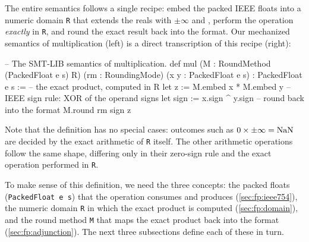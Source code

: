 The entire semantics follows a single recipe:
embed the packed IEEE floats into a numeric domain \texttt{R} that extends the reals with $\pm\infty$ and \nan{},
perform the operation \emph{exactly} in \texttt{R}, and round the exact result back into the format.
Our mechanized semantics of multiplication (left) is a direct transcription of this recipe (right):

\medskip
\noindent
\begin{minipage}[c]{0.5\linewidth}
\begin{lean4}[fontsize=\footnotesize]
-- The SMT-LIB semantics of multiplication.
def mul (M : RoundMethod (PackedFloat e s) R)
    (rm : RoundingMode)
    (x y : PackedFloat e s) : PackedFloat e s :=
  -- the exact product, computed in R
  let z    := M.embed x * M.embed y
  -- IEEE sign rule: XOR of the operand signs
  let sign := x.sign ^ y.sign
  -- round back into the format
  M.round rm sign z
\end{lean4}
\end{minipage}\hfill
\begin{minipage}[c]{0.49\linewidth}
\centering
{}
\end{minipage}
\medskip

\noindent
Note that the definition has no special cases:
outcomes such as $0 \times \pm\infty = \mathrm{NaN}$ are decided by the exact arithmetic of \texttt{R} itself.
The other arithmetic operations follow the same shape,
differing only in their zero-sign rule and the exact operation performed in \texttt{R}.

To make sense of this definition, we need the three concepts:
the packed floats (\texttt{PackedFloat e s}) that the operation consumes and produces (\cref{sec:fp:ieee754}),
the numeric domain \texttt{R} in which the exact product is computed (\cref{sec:fp:domain}),
and the round method \texttt{M} that maps the exact product back into the format (\cref{sec:fp:adjunction}).
The next three subsections define each of these in turn.

